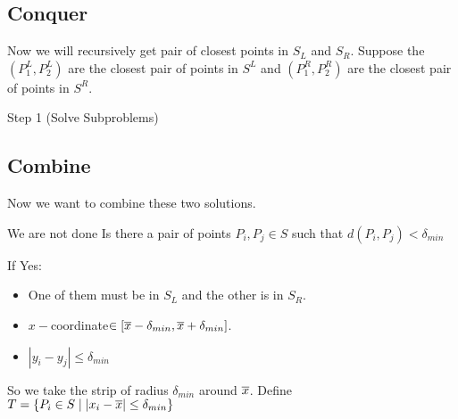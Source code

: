 \begin{center}
\begin{minipage}{0.35\textwidth}
\begin{tikzpicture}[x=0.75pt,y=0.75pt,yscale=-1,xscale=1]
\end{tikzpicture}


    \end{minipage}
\end{center}

\subsection{Conquer} Now we will recursively get pair of closest points in $S_L$ and $S_R$. Suppose the $(P_1^L,P_2^L)$ are the closest pair of points in $S^L$ and $(P_1^R,P_2^R)$ are the closest pair of points in $S^R$.

\begin{algorithm}[H]
        \DontPrintSemicolon
            \caption{Step 1 (Solve Subproblems)}
        \end{algorithm}

\subsection{Combine}     Now we want to combine these two solutions. 
\begin{question}{We are not done}{}
Is there a pair of points $P_i,P_j\in S$ such that $d(P_i,P_j)<\delta_{min}$
\end{question}
If Yes:
\begin{itemize}
\item One of them must be in $S_L$ and the other is in $S_R$. 
\item $x-$coordinate$\in [\ovx-\delta_{min},\ovx+\delta_{min}]$. 
\item $|y_i-y_j|\leq \delta_{min}$
\end{itemize}
\parinf 

So we take the strip of radius $\delta_{min}$ around $\ovx$. Define $T=\{P_i\in S\mid |x_i-\ovx|\leq \delta_{min}\}$

